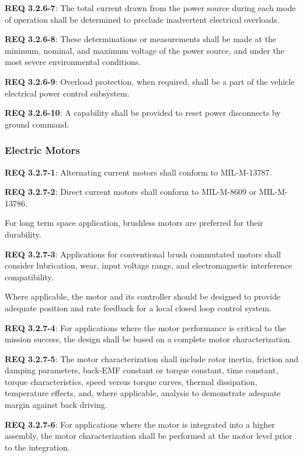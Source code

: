 \documentclass[12pt]{article}
\begin{document}
\noindent \textbf{REQ 3.2.6-7}: The total current drawn from the power source during each mode of operation shall be determined to preclude inadvertent electrical overloads. 

\noindent \textbf{REQ 3.2.6-8}: These determinations or measurements shall be made at the minimum, nominal, and maximum voltage of the power source, and under the most severe environmental conditions. 

\noindent \textbf{REQ 3.2.6-9}: Overload protection, when required, shall be a part of the vehicle electrical power control subsystem. 

\noindent \textbf{REQ 3.2.6-10}: A capability shall be provided to reset power disconnects by ground command.


\subsubsection{Electric Motors} %
\noindent \textbf{REQ 3.2.7-1}: Alternating current motors shall conform to MIL-M-13787. 

\noindent \textbf{REQ 3.2.7-2}: Direct current motors shall conform to MIL-M-8609 or MIL-M-13786. 

For long term space application, brushless motors are preferred for their durability.

\noindent \textbf{REQ 3.2.7-3}: Applications for conventional brush commutated motors shall consider lubrication, wear, input voltage range, and electromagnetic interference compatibility. 

Where applicable, the motor and its controller should be designed to provide adequate position and rate feedback for a local closed loop control system.

\noindent \textbf{REQ 3.2.7-4}: For applications where the motor performance is critical to the mission success, the design shall be based on a complete motor characterization. 

\noindent \textbf{REQ 3.2.7-5}: The motor characterization shall include rotor inertia, friction and damping parameters, back-EMF constant or torque constant, time constant, torque characteristics, speed versus torque curves, thermal dissipation, temperature effects, and, where applicable, analysis to demonstrate adequate margin against back driving.

\noindent \textbf{REQ 3.2.7-6}: For applications where the motor is integrated into a higher assembly, the motor characterization shall be performed at the motor level prior to the integration.
\end{document}
